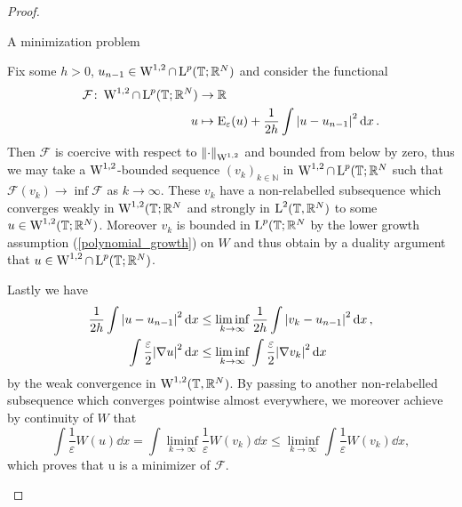 \begin{proof}
	\begin{description}[wide=0pt]
		\item[Step 1:] A minimization problem
		
		Fix some $ h > 0 $, $ u_{ n - 1 } \in \operatorname{W}^{1 , 2 }\cap \operatorname{L}^{ p } ( \mathbb{ T }; \mathbb{ R }^{ N } ) $ and consider the functional
		\begin{align*}
			\mathcal{ F } \colon \operatorname{W}^{ 1, 2 } \cap \operatorname{L}^{ p } ( \mathbb{ T } ; \mathbb{ R }^{ N } )
			& \to
			\mathbb{ R }
			\\
			u & \mapsto 
			\operatorname{E}_{ \varepsilon } ( u ) + 
			\frac{ 1 }{ 2h } \int \abs{ u - u_{ n - 1 } }^{ 2 } \dd{x }.
		\end{align*}
		Then $ \mathcal{ F } $ is coercive with respect to 
		$ \norm{ \cdot }_{ \operatorname{W}^{ 1, 2 } } $ 
		and bounded from below by zero, thus we may take a $ \operatorname{W}^{ 1 , 2 } $-bounded sequence  
		$ (v_{ k } )_{ k \in \mathbb{ N } } $ in $ \operatorname{W}^{ 1 , 2} \cap \operatorname{L}^{ p } ( \mathbb{ T } ; \mathbb{ R }^{ N } $ such that 
		$ \mathcal{ F } ( v_{ k } ) \to \inf \mathcal{ F } $ as $ k \to \infty $. 
		These $ v_{ k } $ have a non-relabelled subsequence which converges weakly in $ \operatorname{W}^{ 1 , 2 } ( \mathbb{ T } ; \mathbb{ R }^{ N } $ and strongly in $ \operatorname{L}^{ 2 } ( \mathbb{ T }, \mathbb{ R }^{ N } ) $ to some $ u \in \operatorname{W}^{ 1, 2 } ( \mathbb{ T }; \mathbb{ R }^{ N } ) $.
		Moreover $ v_{ k } $ is bounded in $ \operatorname{L}^{ p } ( \mathbb{ T } ; \mathbb{ R }^{ N } $ by the lower growth assumption (\ref{polynomial_growth}) on $ W $
		and thus obtain by a duality argument that $ u \in \operatorname{W}^{ 1 , 2 } \cap \operatorname{L}^{ p } ( \mathbb{ T } ; \mathbb{ R }^{ N } ) $.
		
		Lastly we have 
		\begin{align}
			\frac{ 1 }{ 2 h }
			\int \abs{ u - u_{ n - 1 } }^{ 2 } \dd{ x}
			& \leq
			\liminf_{ k \to \infty }
			\frac{ 1 }{ 2h }
			\int \abs{ v_{ k } - u_{ n -1 } }^{ 2 } \dd{ x },
			\\
			\int \frac{ \varepsilon }{ 2 } \abs{ \nabla u }^{ 2 } \dd{ x }
			& \leq
			\liminf_{ k \to \infty }
				\int \frac{ \varepsilon }{ 2 } \abs{ \nabla v_{ k } }^{ 2 } \dd{ x }
		\end{align}
	by the weak convergence in $ \operatorname{W}^{ 1 , 2 } ( \mathbb{ T } , \mathbb{ R }^{ N } )$.
	By passing to another non-relabelled subsequence which converges pointwise almost everywhere, we moreover achieve by continuity of $ W $ that
	\begin{equation*}
		\int \frac{ 1 }{ \varepsilon } W ( u ) \dd{ x }
		=
		\int \liminf_{ k \to \infty } \frac{ 1 }{ \varepsilon } W ( v_{k } ) \dd{ x }
		\leq
		\liminf_{ k \to \infty } \int \frac{ 1 }{ \varepsilon } W ( v_{ k } ) \dd{x},
	\end{equation*}
	which proves that u is a minimizer of $ \mathcal{ F } $.
	

\end{description}
\end{proof}

